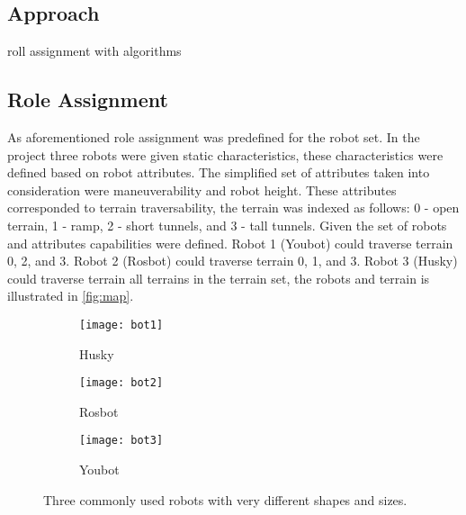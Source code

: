\subsection{Approach}


roll assignment with algorithms


\subsection{Role Assignment}
As aforementioned role assignment was predefined for the robot set. In the project three robots were given static characteristics, these characteristics were defined based on robot attributes. The simplified set of attributes taken into consideration were maneuverability and robot height. These attributes corresponded to terrain traversability, the terrain was indexed as follows: 0 - open terrain, 1 - ramp, 2 - short tunnels, and 3 - tall tunnels. Given the set of robots and attributes capabilities were defined. Robot 1 (Youbot) could traverse terrain 0, 2, and 3. Robot 2 (Rosbot) could traverse terrain 0, 1, and 3. Robot 3 (Husky) could traverse terrain all terrains in the terrain set, the robots and terrain is illustrated in \ref{fig:map}.


\begin{figure}
    \centering
    \begin{subfigure}[b]{0.15\textwidth}
        \texttt{[image: bot1]}
        \caption{Husky}
        \label{fig:bot1}
    \end{subfigure}
    \begin{subfigure}[b]{0.15\textwidth}
        \texttt{[image: bot2]}
        \caption{Rosbot}
        \label{fig:bot2}
    \end{subfigure}
    \begin{subfigure}[b]{0.15\textwidth}
        \texttt{[image: bot3]}
        \caption{Youbot}
        \label{fig:bot3}
    \end{subfigure}
    \caption{Three commonly used robots with very different shapes and sizes.}\label{fig:bots}
\end{figure}

